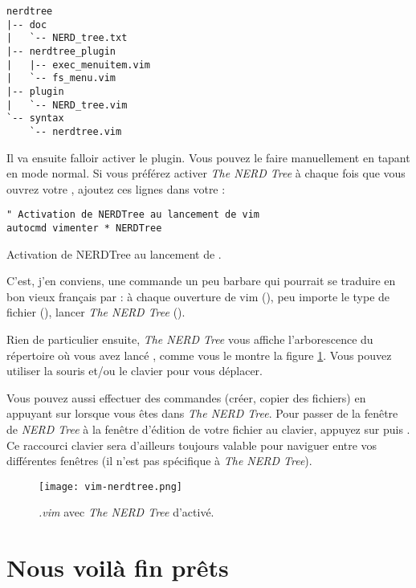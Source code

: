 \begin{verbatim}
nerdtree
|-- doc
|   `-- NERD_tree.txt
|-- nerdtree_plugin
|   |-- exec_menuitem.vim
|   `-- fs_menu.vim
|-- plugin
|   `-- NERD_tree.vim
`-- syntax
    `-- nerdtree.vim
\end{verbatim}

Il va ensuite falloir activer le plugin. Vous pouvez le faire manuellement en tapant  en mode normal. Si vous préférez activer \emph{The NERD Tree} à chaque fois que vous ouvrez votre \vim, ajoutez ces lignes dans votre \vimrc:

\begin{listing}[H]
\begin{verbatim}
" Activation de NERDTree au lancement de vim
autocmd vimenter * NERDTree
\end{verbatim}
\caption{Activation de NERDTree au lancement de \vim.}
\label{code:nerdtreee}
\end{listing}

C'est, j'en conviens, une commande un peu barbare qui pourrait se traduire en bon vieux français par : à chaque ouverture de vim (), peu importe le type de fichier (\hlred{\Verb|*|}), lancer \emph{The NERD Tree} ().

Rien de particulier ensuite, \emph{The NERD Tree} vous affiche l'arborescence du répertoire où vous avez lancé \vim, comme vous le montre la figure \ref{fig:vim-nerdtree}. Vous pouvez utiliser la souris et/ou le clavier pour vous déplacer. 

Vous pouvez aussi effectuer des commandes (créer, copier des fichiers) en appuyant sur \ttm\xspace lorsque vous êtes dans \emph{The NERD Tree}. Pour passer de la fenêtre de \emph{NERD Tree} à la fenêtre d'édition de votre fichier au clavier, appuyez sur  puis . Ce raccourci clavier sera d'ailleurs toujours valable pour naviguer entre vos différentes fenêtres \vim (il n'est pas spécifique à \emph{The NERD Tree}).

\begin{figure}%
  \texttt{[image: vim-nerdtree.png]}
  \caption{\emph{.vim} avec \emph{The NERD Tree} d'activé.}
  \label{fig:vim-nerdtree}
\end{figure}

\section{Nous voilà fin prêts}

